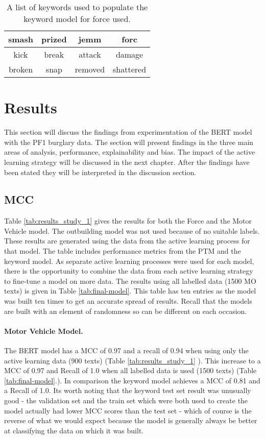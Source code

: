 \begin{table}[]
\begin{tabular}{|c|c|c|c|}
\hline
smash  & prized & jemm    & forc      \\ \hline
kick   & break  & attack  & damage    \\ \hline
broken & snap   & removed & shattered \\ \hline
\end{tabular}
\caption[Keywords for keyword model - force used]{\label{tab:Keywords_force} A list of keywords used to populate the keyword model for force used.}
\end{table}


\section{Results} This section will discuss the findings from experimentation of the BERT model with the PF1 burglary data. The section will present findings in the three main areas of analysis, performance, explainability and bias. The impact of the active learning strategy will be discussed in the next chapter. After the findings have been stated they will be interpreted in the discussion section.



\subsection{MCC} Table \ref{tab:results_study_1} gives the results for both the Force and the Motor Vehicle model. The outbuilding model was not used because of no suitable labels. These results are generated using the data from the active learning process for that model. The table includes performance metrics from the PTM and the keyword model. As separate active learning processes were used for each model, there is the opportunity to combine the data from each active learning strategy to fine-tune a model on more data. The results using all labelled data (1500 MO texts) is given in Table \ref{tab:final-model}. This table has ten entries as the model was built ten times to get an accurate spread of results. Recall that the models are built with an element of randomness so can be different on each occasion.

\paragraph{Motor Vehicle Model.} The BERT model has a MCC of 0.97 and a recall of 0.94 when using only the active learning data (900 texts) (Table \ref{tab:results_study_1} ). This increase to a MCC of 0.97 and Recall of 1.0 when all labelled data is used (1500 texts) (Table \ref{tab:final-model}.). In comparison the keyword model achieves a MCC of 0.81 and a Recall of 1.0. Its worth noting that the keyword test set result was unusually good - the validation set and the train set which were both used to create the model actually had lower MCC scores than the test set - which of course is the reverse of what we would expect because the model is generally always be better at classifying the data on which it was built.

